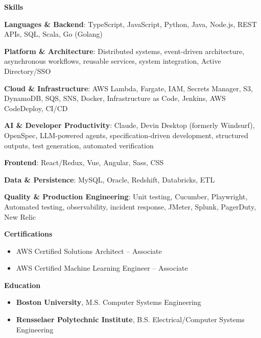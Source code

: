 \documentclass[10pt]{article}
\begin{document}
  \vspace{0.5em}
  {\large \textbf{Skills}}

  \begin{flushleft}
    \addtolength{\leftskip}{.3in}


    \textbf{Languages \& Backend}: TypeScript, JavaScript, Python, Java, Node.js, REST APIs, SQL, Scala, Go (Golang)
    \vspace{0.3em}

    \textbf{Platform \& Architecture}: Distributed systems, event-driven architecture, asynchronous workflows, reusable services, system integration, Active Directory/SSO
    \vspace{0.3em}

    \textbf{Cloud \& Infrastructure}: AWS Lambda, Fargate, IAM, Secrets Manager, S3, DynamoDB, SQS, SNS, Docker, Infrastructure as Code, Jenkins, AWS CodeDeploy, CI/CD
    \vspace{0.3em}

    \textbf{AI \& Developer Productivity}: Claude, Devin Desktop (formerly Windsurf), OpenSpec, LLM-powered agents, specification-driven development, structured outputs, test generation, automated verification
    \vspace{0.3em}

    \textbf{Frontend}: React/Redux, Vue, Angular, Sass, CSS
    \vspace{0.3em}

    \textbf{Data \& Persistence}: MySQL, Oracle, Redshift, Databricks, ETL
    \vspace{0.3em}

    \textbf{Quality \& Production Engineering}: Unit testing, Cucumber, Playwright, Automated testing, observability, incident response, JMeter, Splunk, PagerDuty, New Relic
    \vspace{0.3em}

  \end{flushleft}

  \vspace{0.5em}
  {\large \textbf{Certifications}}
  \begin{itemize}

      \item AWS Certified Solutions Architect – Associate

      \item AWS Certified Machine Learning Engineer – Associate

  \end{itemize}

  \vspace{0.5em}
  {\large \textbf{Education}}
  \begin{itemize}

    \item
      \textbf{Boston University}, M.S. Computer Systems Engineering

    \item
      \textbf{Rensselaer Polytechnic Institute}, B.S. Electrical/Computer Systems Engineering

  \end{itemize}
\end{document}
